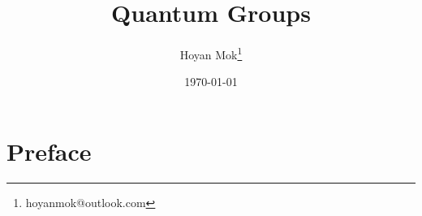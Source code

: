 \documentclass[openany, a5paper]{book}
\title{Quantum Groups}
\author{Hoyan Mok\thanks{hoyanmok@outlook.com}}
\date{\today} %
\DeclareMathOperator{\Op}{Op}
\begin{document}
\maketitle %
\frontmatter
\chapter{Preface}







\end{document}
